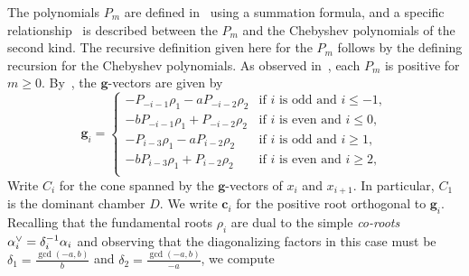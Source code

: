 \documentclass[10pt,a4paper]{amsart}
\theoremstyle{definition}
\newcommand{\ck}{\spcheck}
\newcommand{\g}{\mathbf{g}}
\newcommand{\cc}{\mathbf{c}}
\begin{document}
The polynomials $P_m$ are defined in~\cite[Section~9]{universal} using a summation formula, and a specific relationship~\cite[(9.10)]{universal} is described between the $P_m$ and the Chebyshev polynomials of the second kind.
The recursive definition given here for the $P_m$ follows by the defining recursion for the Chebyshev polynomials.
As observed in~\cite[Section~9]{universal}, each $P_m$ is positive for $m\ge0$.
By~\cite[Proposition~9.6]{universal}, the $\g$-vectors are given by
\begin{equation}\label{ba gs}
\g_i=\begin{cases}
-P_{-i-1}\rho_1-aP_{-i-2}\rho_2&\text{if }i\text{ is odd and }i\le-1,\\
-bP_{-i-1}\rho_1+P_{-i-2}\rho_2&\text{if }i\text{ is even and }i\le0,\\
-P_{i-3}\rho_1-aP_{i-2}\rho_2&\text{if }i\text{ is odd and }i\ge1,\\
-bP_{i-3}\rho_1+P_{i-2}\rho_2&\text{if }i\text{ is even and }i\ge2,\\
\end{cases}
\end{equation}
Write $C_i$ for the cone spanned by the $\g$-vectors of $x_i$ and $x_{i+1}$.
In particular, $C_1$ is the dominant chamber $D$.
We write $\cc_i$ for the positive root orthogonal to $\g_i$. 
Recalling that the fundamental roots $\rho_i$ are dual to the simple \emph{co-roots} $\alpha_i\ck=\delta_i^{-1}\alpha_i$ and observing that the diagonalizing factors in this case must be 
$\delta_1=\frac{\gcd(-a,b)}{b}$ and $\delta_2=\frac{\gcd(-a,b)}{-a}$, we compute
\end{document}
